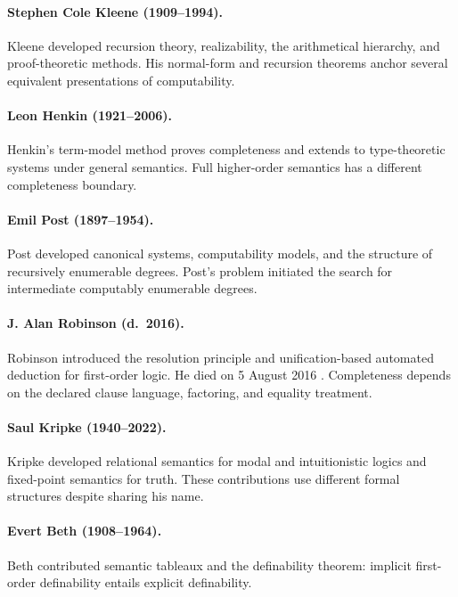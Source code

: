 \paragraph{Stephen Cole Kleene (1909--1994).}
Kleene developed recursion theory, realizability, the arithmetical hierarchy,
and proof-theoretic methods. His normal-form and recursion theorems anchor
several equivalent presentations of computability.

\paragraph{Leon Henkin (1921--2006).}
Henkin's term-model method proves completeness and extends to type-theoretic
systems under general semantics. Full higher-order semantics has a different
completeness boundary.

\paragraph{Emil Post (1897--1954).}
Post developed canonical systems, computability models, and the structure of
recursively enumerable degrees. Post's problem initiated the search for
intermediate computably enumerable degrees.

\paragraph{J. Alan Robinson (d.\ 2016).}
Robinson introduced the resolution principle and unification-based automated
deduction for first-order logic. He died on 5 August 2016
\cite{BundyGoebel2016AARRobinson}. Completeness depends on the declared clause
language, factoring, and equality treatment.

\paragraph{Saul Kripke (1940--2022).}
Kripke developed relational semantics for modal and intuitionistic logics and
fixed-point semantics for truth. These contributions use different formal
structures despite sharing his name.

\paragraph{Evert Beth (1908--1964).}
Beth contributed semantic tableaux and the definability theorem: implicit
first-order definability entails explicit definability.

